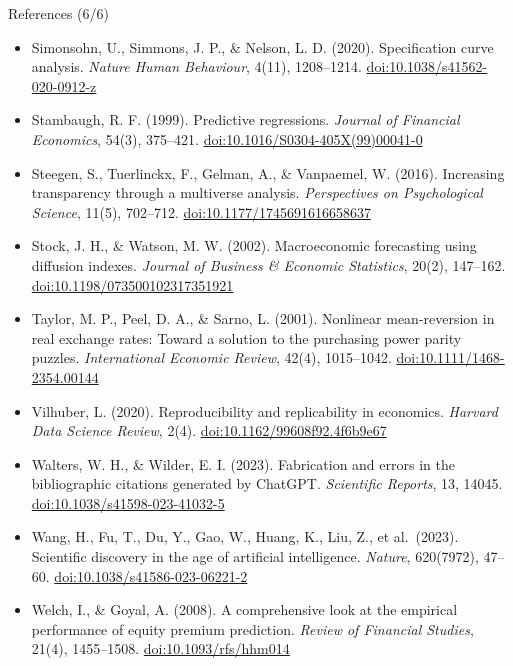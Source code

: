 \begin{frame}{References (6/6)}
\itemsize{\tiny}
\begin{itemize}
    \item Simonsohn, U., Simmons, J. P., \& Nelson, L. D. (2020). Specification curve analysis. \textit{Nature Human Behaviour}, 4(11), 1208--1214. \href{https://doi.org/10.1038/s41562-020-0912-z}{doi:10.1038/s41562-020-0912-z}
    \item Stambaugh, R. F. (1999). Predictive regressions. \textit{Journal of Financial Economics}, 54(3), 375--421. \href{https://doi.org/10.1016/S0304-405X(99)00041-0}{doi:10.1016/S0304-405X(99)00041-0}
    \item Steegen, S., Tuerlinckx, F., Gelman, A., \& Vanpaemel, W. (2016). Increasing transparency through a multiverse analysis. \textit{Perspectives on Psychological Science}, 11(5), 702--712. \href{https://doi.org/10.1177/1745691616658637}{doi:10.1177/1745691616658637}
    \item Stock, J. H., \& Watson, M. W. (2002). Macroeconomic forecasting using diffusion indexes. \textit{Journal of Business \& Economic Statistics}, 20(2), 147--162. \href{https://doi.org/10.1198/073500102317351921}{doi:10.1198/073500102317351921}
    \item Taylor, M. P., Peel, D. A., \& Sarno, L. (2001). Nonlinear mean-reversion in real exchange rates: Toward a solution to the purchasing power parity puzzles. \textit{International Economic Review}, 42(4), 1015--1042. \href{https://doi.org/10.1111/1468-2354.00144}{doi:10.1111/1468-2354.00144}
    \item Vilhuber, L. (2020). Reproducibility and replicability in economics. \textit{Harvard Data Science Review}, 2(4). \href{https://doi.org/10.1162/99608f92.4f6b9e67}{doi:10.1162/99608f92.4f6b9e67}
    \item Walters, W. H., \& Wilder, E. I. (2023). Fabrication and errors in the bibliographic citations generated by ChatGPT. \textit{Scientific Reports}, 13, 14045. \href{https://doi.org/10.1038/s41598-023-41032-5}{doi:10.1038/s41598-023-41032-5}
    \item Wang, H., Fu, T., Du, Y., Gao, W., Huang, K., Liu, Z., et al.\ (2023). Scientific discovery in the age of artificial intelligence. \textit{Nature}, 620(7972), 47--60. \href{https://doi.org/10.1038/s41586-023-06221-2}{doi:10.1038/s41586-023-06221-2}
    \item Welch, I., \& Goyal, A. (2008). A comprehensive look at the empirical performance of equity premium prediction. \textit{Review of Financial Studies}, 21(4), 1455--1508. \href{https://doi.org/10.1093/rfs/hhm014}{doi:10.1093/rfs/hhm014}

\end{itemize}
\end{frame}
